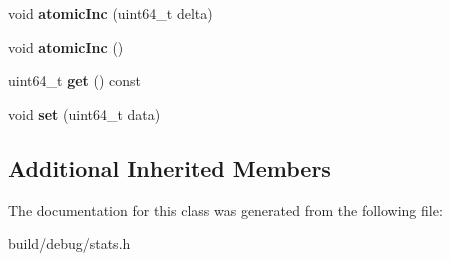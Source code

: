 \begin{DoxyCompactItemize}
\item 
\hypertarget{classCounter_ac5e80a29c4063ab0faef1c25d31f48ed}{void {\bfseries atomic\-Inc} (uint64\-\_\-t delta)}\label{classCounter_ac5e80a29c4063ab0faef1c25d31f48ed}

\item 
\hypertarget{classCounter_a937c25ffb0c2049d293cb480ce5aa155}{void {\bfseries atomic\-Inc} ()}\label{classCounter_a937c25ffb0c2049d293cb480ce5aa155}

\item 
\hypertarget{classCounter_a7af39c45db59374d9fb96cdebae210bc}{uint64\-\_\-t {\bfseries get} () const }\label{classCounter_a7af39c45db59374d9fb96cdebae210bc}

\item 
\hypertarget{classCounter_afeff3d9b8fa53c0bd7ea8b36363a478a}{void {\bfseries set} (uint64\-\_\-t data)}\label{classCounter_afeff3d9b8fa53c0bd7ea8b36363a478a}

\end{DoxyCompactItemize}
\subsection*{Additional Inherited Members}


The documentation for this class was generated from the following file\-:\begin{DoxyCompactItemize}
\item 
build/debug/stats.\-h\end{DoxyCompactItemize}
